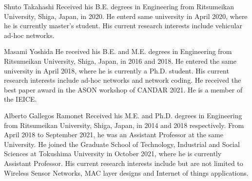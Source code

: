 \documentclass[conference]{IEEEtran}
\begin{document}
\vspace{-1.0cm}
\begin{IEEEbiography}{Shuto 
Takahashi}
Received his B.E. degrees in Engineering from Ritsumeikan University, 
Shiga, Japan, in 2020. He enterd same university in April 2020, where he 
is currently master's student. His current research interests include 
vehicular ad-hoc networks.
\end{IEEEbiography}
\vspace{-1.0cm}
\begin{IEEEbiography}{Masami 
Yoshida}
He received his B.E. and M.E. degrees in Engineering from Ritsumeikan 
University, Shiga, Japan, in 2016 and 2018. He entered the same 
university in April 2018, where he is currently a Ph.D. student. His 
current research interests include ad-hoc networks and network coding. 
He received the best paper award in the ASON workshop of CANDAR 2021. He 
is a member of the IEICE.
\end{IEEEbiography}
\vspace{-1.0cm}
\begin{IEEEbiography}{Alberto 
Gallegos Ramonet}
Received his M.E. and Ph.D. degrees in Engineering from Ritsumeikan 
University, Shiga, Japan, in 2014 and 2018 respectively. From April 2018 
to September 2021, he was an Assistant Professor at the same University. 
He joined the Graduate School of Technology, Industrial and Social 
Sciences at Tokushima University in October 2021, where he is currently 
Assistant Professor. His current research interests include but are not 
limited to Wireless Sensor Networks, MAC layer designs and Internet of 
things applications.
\end{IEEEbiography}
\end{document}
